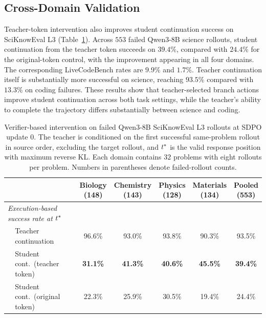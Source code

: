 \subsection{Cross-Domain Validation}
\label{app:crossdomain}

Teacher-token intervention also improves student continuation success on SciKnowEval L3 (Table~\ref{tab:tstar_fail_lcb_science_qwen8b}). Across $553$ failed Qwen3-8B science rollouts, student continuation from the teacher token succeeds on $39.4\%$, compared with $24.4\%$ for the original-token control, with the improvement appearing in all four domains. The corresponding LiveCodeBench rates are $9.9\%$ and $1.7\%$. Teacher continuation itself is substantially more successful on science, reaching $93.5\%$ compared with $13.3\%$ on coding failures. These results show that teacher-selected branch actions improve student continuation across both task settings, while the teacher's ability to complete the trajectory differs substantially between science and coding.

\begin{table}[ht]
\caption{Verifier-based intervention on failed Qwen3-8B SciKnowEval L3 rollouts at SDPO update 0. The teacher is conditioned on the first successful same-problem rollout in source order, excluding the target rollout, and $t^{*}$ is the valid response position with maximum reverse KL. Each domain contains $32$ problems with eight rollouts per problem. Numbers in parentheses denote failed-rollout counts.}  \label{tab:tstar_fail_lcb_science_qwen8b}
  \centering
  \small
  \setlength{\tabcolsep}{3.5pt}
  \begin{tabular*}{\textwidth}
    {@{\extracolsep{\fill}}llccccc@{\hspace{6pt}}}
    \toprule
    & & \makecell{Biology\\(148)}
    & \makecell{Chemistry\\(143)}
    & \makecell{Physics\\(128)}
    & \makecell{Materials\\(134)}
    & \makecell{Pooled\\(553)} \\
    \midrule
    \multicolumn{2}{l}{\textit{Execution-based success rate at $t^{*}$}} \\
    & \hspace{1em}Teacher continuation
      & 96.6\% & 93.0\% & 93.8\% & 90.3\% & 93.5\% \\
    & \hspace{1em}Student cont.\ (teacher token)
      & \textbf{31.1\%} & \textbf{41.3\%} & \textbf{40.6\%} & \textbf{45.5\%} & \textbf{39.4\%} \\
    & \hspace{1em}Student cont.\ (original token)
      & 22.3\% & 25.9\% & 30.5\% & 19.4\% & 24.4\% \\
    \bottomrule
  \end{tabular*}
\end{table}

